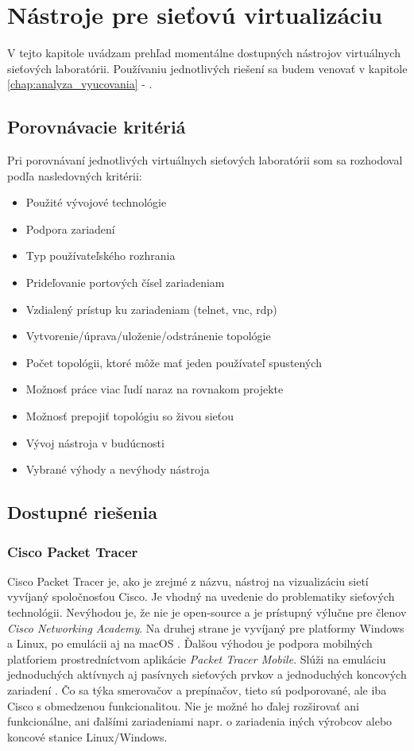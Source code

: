 \chapter{Nástroje pre sieťovú virtualizáciu}
\label{chap:nastroje_pre_siet_virt}

V tejto kapitole uvádzam prehľad momentálne dostupných nástrojov virtuálnych sieťových laboratórii. Používaniu jednotlivých riešení sa budem venovať v kapitole \ref{chap:analyza_vyucovania} - .
  
\section{Porovnávacie kritériá}

Pri porovnávaní jednotlivých virtuálnych sieťových laboratórii som sa rozhodoval podľa nasledovných kritérii:
\begin{itemize}
    \item Použité vývojové technológie
    \item Podpora zariadení
    \item Typ používateľského rozhrania
    \item Prideľovanie portových čísel zariadeniam
    \item Vzdialený prístup ku zariadeniam (telnet, vnc, rdp)
    \item Vytvorenie/úprava/uloženie/odstránenie topológie
    \item Počet topológii, ktoré môže mať jeden používateľ spustených
    \item Možnosť práce viac ľudí naraz na rovnakom projekte
    \item Možnosť prepojiť topológiu so živou sieťou
    \item Vývoj nástroja v budúcnosti
    \item Vybrané výhody a nevýhody nástroja
\end{itemize}


\section{Dostupné riešenia}

\subsection{Cisco Packet Tracer}

Cisco Packet Tracer je, ako je zrejmé z názvu, nástroj na vizualizáciu sietí vyvíjaný spoločnosťou Cisco. Je vhodný na uvedenie do problematiky sieťových technológii. Nevýhodou je, že nie je open-source a je prístupný výlučne pre členov \emph{Cisco Networking Academy}. Na druhej strane je vyvíjaný pre platformy Windows a Linux, po emulácii aj na macOS \cite{packet_tracer_mac}. Ďalšou výhodou je podpora mobilných platforiem prostredníctvom aplikácie \emph{Packet Tracer Mobile}. Slúži na emuláciu jednoduchých aktívnych aj pasívnych sieťových prvkov a jednoduchých koncových zariadení \cite{packet_tracer}. Čo sa týka smerovačov a prepínačov, tieto sú podporované, ale iba Cisco s obmedzenou funkcionalitou. Nie je možné ho ďalej rozširovať ani funkcionálne, ani ďalšími zariadeniami napr. o zariadenia iných výrobcov alebo koncové stanice Linux/Windows.

